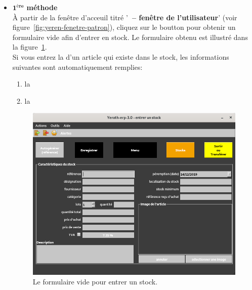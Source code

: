 \begin{itemize}[]
	\item \textcolor{purplish}{$\mathbf{1^{\text{\`ere}}}$ \textbf{m\'ethode}}\\
		   \`A partir de la fen\^etre d'acceuil titr\'e
		   '\textbf{\yerotherptitle\ -- fen\^etre de l'utilisateur}'
		   (voir figure~\ref{fig:yeren-fenetre-patron}), cliquez
		   sur le boutton  pour obtenir un
		   formulaire vide afin d'entrer en stock. Le formulaire
		   obtenu est illustr\'e dans la figure~\ref{fig:formulaire-entrer-1}.\\
		   
		   Si vous entrez la  d'un article qui existe
		   \deja dans le stock, les informations suivantes sont
		   automatiquement remplies:
		   \begin{enumerate}[1)]
		   		\item la 
		   		\item la  \\		   		
		   \end{enumerate}		    
		   
	      \begin{figure}[!htbp]
		  \centering
		  \includegraphics[scale=0.63]{images/yeren-fenetre-entrer.png}
		  \caption{Le formulaire vide pour entrer un stock.}
		  \label{fig:formulaire-entrer-1}
		  \end{figure}	     
	      
	\newpage	      
	      

\end{itemize}
